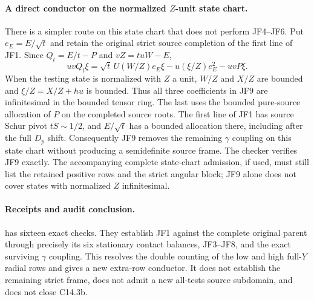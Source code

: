 \paragraph{A direct conductor on the normalized $Z$-unit state chart.}
There is a simpler route on this state chart that does not perform JF4--JF6.
Put $e_E=E/\sqrt t$ and retain the original strict source completion
of the first line of JF1. Since $Q_t=E/t-P$ and $vZ=tuW-E$,
\[
 uvQ_t\xi=\sqrt t\,U(W/Z)e_E\xi
             -u(\xi/Z)e_E^2-uvP\xi.                \tag{JF9}
\]
When the testing state is normalized with $Z$ a unit, $W/Z$ and
$X/Z$ are bounded and $\xi/Z=X/Z+hu$ is bounded. Thus all three
coefficients in JF9 are infinitesimal in the bounded tensor ring.
The last uses the bounded pure-source allocation of $P$ on the
completed source roots. The first line of JF1 has source Schur pivot
$tS\sim1/2$, and $E/\sqrt t$ has a bounded allocation there,
including after the full $D_p$ shift. Consequently JF9 removes the
remaining $\gamma$ coupling on this state chart without producing
a semidefinite source frame. The checker verifies JF9 exactly.
The accompanying complete state-chart admission, if used, must still
list the retained positive rows and the strict angular block; JF9
alone does not cover states with normalized $Z$ infinitesimal.

\paragraph{Receipts and audit conclusion.}
 has sixteen exact checks. They establish
JF1 against the complete original parent through precisely its six
stationary contact balances, JF3--JF8, and the exact surviving
$\gamma$ coupling. This resolves the double counting of the low and
high full-$Y$ radial rows and gives a new extra-row conductor.
It does not establish the remaining strict frame, does not admit a
new all-tests source subdomain, and does not close C14.3b.
